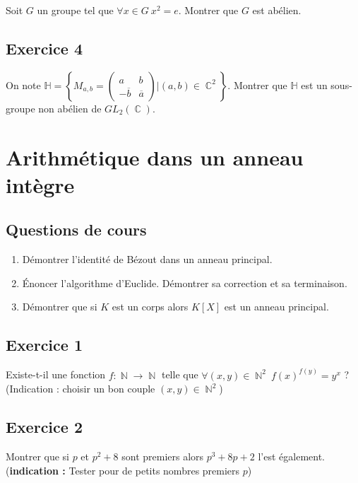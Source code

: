 \documentclass{article}
\DeclareMathOperator{\C}{\mathbb{C}}
\DeclareMathOperator{\N}{\mathbb{N}}
\begin{document}
Soit $G$ un groupe tel que $\forall x \in G \ x^2 = e$. Montrer que $G$ est abélien. 

\subsection*{Exercice 4} 

On note $\mathbb{H} = \left\{ M_{a,b} = 
\begin{pmatrix} 
    a & b\\
    -\overline{b} & \overline{a} 
    
\end{pmatrix}  |  (a,b)\in \C^2 \right\}$. Montrer que $\mathbb{H}$ est un sous-groupe non abélien de $GL_2(\C)$. 

\clearpage

\section{Arithmétique dans un anneau intègre} 

\subsection*{Questions de cours} 

\begin{enumerate}
    \item Démontrer l'identité de Bézout dans un anneau principal. 
    \item Énoncer l'algorithme d'Euclide. Démontrer sa correction et sa terminaison. 
    \item Démontrer que si $K$ est un corps alors $K[X]$ est un anneau principal. 
\end{enumerate}
\subsection*{Exercice 1} 

Existe-t-il une fonction $f : \N \to \N$ telle que $\forall (x,y)\in \N^2 \ f(x)^{f(y)} = y^x$ ? (Indication : choisir un bon couple $(x, y) \in \N^2$) 

\subsection*{Exercice 2} 

Montrer que si $p$ et $p^2+8$ sont premiers alors $p^3 + 8p + 2$ l'est également. (\textbf{indication :}  Tester pour de petits nombres  premiers $p$) 
\end{document}
